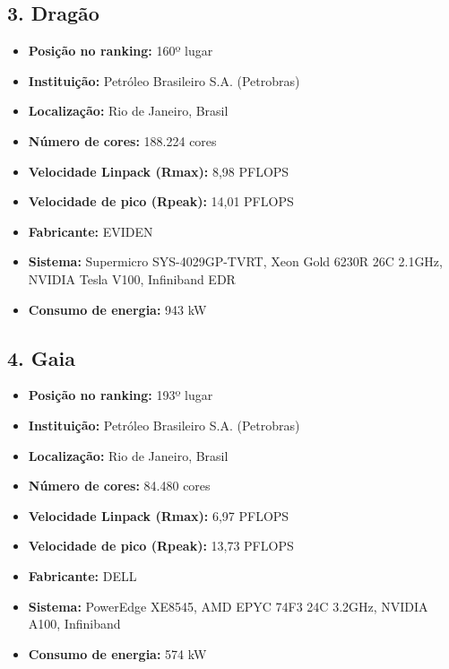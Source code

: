 \documentclass[12pt,a4paper]{article}
\begin{document}
\subsection*{3. Dragão}
\begin{itemize}
    \item \textbf{Posição no ranking:} 160º lugar
    \item \textbf{Instituição:} Petróleo Brasileiro S.A. (Petrobras)
    \item \textbf{Localização:} Rio de Janeiro, Brasil
    \item \textbf{Número de cores:} 188.224 cores
    \item \textbf{Velocidade Linpack (Rmax):} 8,98 PFLOPS
    \item \textbf{Velocidade de pico (Rpeak):} 14,01 PFLOPS
    \item \textbf{Fabricante:} EVIDEN
    \item \textbf{Sistema:} Supermicro SYS-4029GP-TVRT, Xeon Gold 6230R 26C 2.1GHz, NVIDIA Tesla V100, Infiniband EDR
    \item \textbf{Consumo de energia:} 943 kW
\end{itemize}

\newpage
\subsection*{4. Gaia}
\begin{itemize}
    \item \textbf{Posição no ranking:} 193º lugar
    \item \textbf{Instituição:} Petróleo Brasileiro S.A. (Petrobras)
    \item \textbf{Localização:} Rio de Janeiro, Brasil
    \item \textbf{Número de cores:} 84.480 cores
    \item \textbf{Velocidade Linpack (Rmax):} 6,97 PFLOPS
    \item \textbf{Velocidade de pico (Rpeak):} 13,73 PFLOPS
    \item \textbf{Fabricante:} DELL
    \item \textbf{Sistema:} PowerEdge XE8545, AMD EPYC 74F3 24C 3.2GHz, NVIDIA A100, Infiniband
    \item \textbf{Consumo de energia:} 574 kW
\end{itemize}
\end{document}
